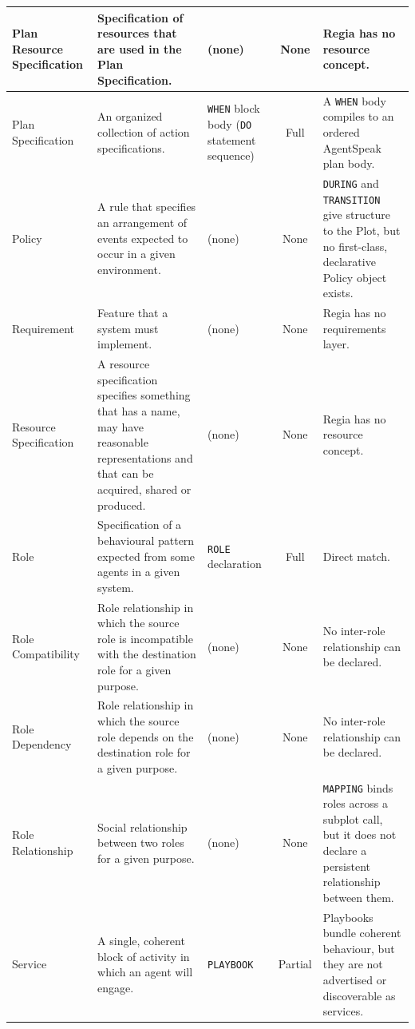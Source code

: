 \begin{longtable}{|p{}|p{}|p{}|c|p{}|}
Plan Resource Specification &
Specification of resources that are used in the Plan Specification. &
(none) &
None &
Regia has no resource concept. \\
\hline

Plan Specification &
An organized collection of action specifications. &
\lstinline|WHEN| block body (\lstinline|DO| statement sequence) &
Full &
A \lstinline|WHEN| body compiles to an ordered AgentSpeak plan body. \\
\hline

Policy &
A rule that specifies an arrangement of events expected to occur in a given environment. &
(none) &
None &
\lstinline|DURING| and \lstinline|TRANSITION| give structure to the Plot, but no first-class, declarative Policy object exists. \\
\hline

Requirement &
Feature that a system must implement. &
(none) &
None &
Regia has no requirements layer. \\
\hline

Resource Specification &
A resource specification specifies something that has a name, may have reasonable representations and that can be acquired, shared or produced. &
(none) &
None &
Regia has no resource concept. \\
\hline

Role &
Specification of a behavioural pattern expected from some agents in a given system. &
\lstinline|ROLE| declaration &
Full &
Direct match. \\
\hline

Role Compatibility &
Role relationship in which the source role is incompatible with the destination role for a given purpose. &
(none) &
None &
No inter-role relationship can be declared. \\
\hline

Role Dependency &
Role relationship in which the source role depends on the destination role for a given purpose. &
(none) &
None &
No inter-role relationship can be declared. \\
\hline

Role Relationship &
Social relationship between two roles for a given purpose. &
(none) &
None &
\lstinline|MAPPING| binds roles across a subplot call, but it does not declare a persistent relationship between them. \\
\hline

Service &
A single, coherent block of activity in which an agent will engage. &
\lstinline|PLAYBOOK| &
Partial &
Playbooks bundle coherent behaviour, but they are not advertised or discoverable as services. \\
\hline


\end{longtable}

